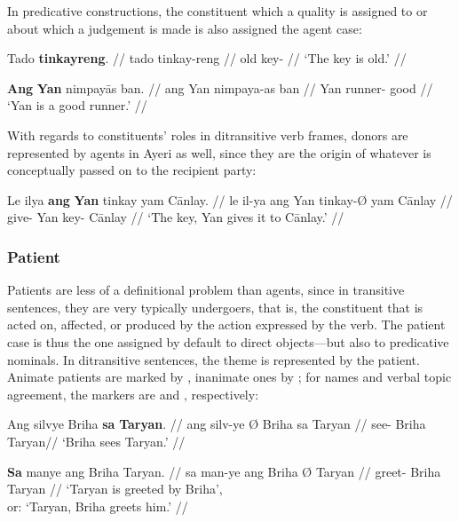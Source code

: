 \xe

In predicative constructions, the constituent which a quality is assigned to or
about which a judgement is made is also assigned the agent case:

\pex
\a\begingl
	\gla Tado \textbf{tinkayreng}. //
	\glb tado tinkay-reng //
	\glc old key-\AargI{} //
	\glft `The key is old.' //
\endgl

\a\begingl
	\gla \textbf{Ang} \textbf{Yan} nimpayās ban. //
	\glb ang Yan nimpaya-as ban //
	\glc \Aarg{} Yan runner-\Parg{} good //
	\glft `Yan is a good runner.' //
\endgl

\xe


With regards to constituents' roles in ditransitive verb frames, donors are 
represented by agents in Ayeri as well, since they are the origin of whatever 
is conceptually passed on to the recipient party:

\ex\begingl
	\gla Le ilya \textbf{ang} \textbf{Yan} tinkay yam Cānlay. //
	\glb le il-ya ang Yan tinkay-Ø yam Cānlay //
	\glc \PatT{} give-\TsgM{} \Aarg{} Yan key-\Top{} \Dat{} Cānlay //
	\glft `The key, Yan gives it to Cānlay.' //
\endgl\xe

\subsubsection{Patient}

Patients are less of a definitional problem than agents, since in transitive
sentences, they are very typically undergoers, that is, the constituent that is
acted on, affected, or produced by the action expressed by the verb. The
patient case is thus the one assigned by default to direct objects---but also
to predicative nominals. In ditransitive sentences, the theme is represented by
the patient. Animate patients are marked by , inanimate ones by
; for names and verbal topic agreement, the markers are 
 and , respectively:

\pex
\a\begingl
	\gla Ang silvye {} Briha \textbf{sa} \textbf{Taryan}. //
	\glb ang silv-ye Ø Briha sa Taryan //
	\glc \AgtT{} see-\TsgF{} \Top{} Briha \Parg{} Taryan//
	\glft `Briha sees Taryan.' //
\endgl

\a\begingl
	\gla \textbf{Sa} manye ang Briha {} Taryan. //
	\glb sa man-ye ang Briha Ø Taryan //
	\glc \PatT{} greet-\TsgF{} \Aarg{} Briha \Top{} Taryan //
	\glft `Taryan is greeted by Briha',\\
		or: `Taryan, Briha greets him.' //
\endgl

